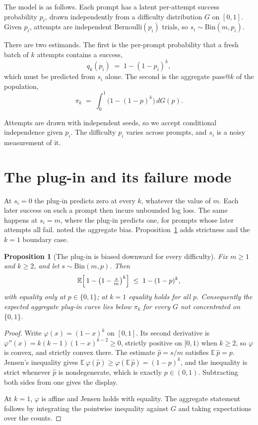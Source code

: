 \documentclass[11pt]{article}
\theoremstyle{itheads}
\newtheorem{proposition}{Proposition}
\begin{document}
The model is as follows. Each prompt has a latent per-attempt
success probability $p_i$, drawn independently from a difficulty
distribution $G$ on $[0,1]$. Given $p_i$, attempts are independent
$\mathrm{Bernoulli}(p_i)$ trials, so $s_i \sim \mathrm{Bin}(m,
p_i)$.

There are two estimands. The first is the per-prompt probability
that a fresh batch of $k$ attempts contains a success,
\begin{equation}
q_k(p_i) \;=\; 1-(1-p_i)^{k},
\end{equation}
which must be predicted from $s_i$ alone. The second is the
aggregate pass@$k$ of the population,
\begin{equation}
\pi_k \;=\; \int_0^1 \bigl(1-(1-p)^k\bigr)\,dG(p).
\end{equation}

Attempts are drawn with independent seeds, so we accept conditional
independence given $p_i$. The difficulty $p_i$ varies across
prompts, and $s_i$ is a noisy measurement of it.

\section{The plug-in and its failure mode}

At $s_i=0$ the plug-in predicts zero at every $k$, whatever the
value of $m$. Each later success on such a prompt then incurs
unbounded log loss. The same happens at $s_i = m$, where the plug-in
predicts one, for prompts whose later attempts all fail.
\citet{chen2021} noted the aggregate bias.
Proposition~\ref{prop:bias} adds strictness and the $k=1$ boundary
case.

\begin{proposition}[The plug-in is biased downward for every
difficulty]\label{prop:bias}
Fix $m \ge 1$ and $k \ge 2$, and let $s \sim \mathrm{Bin}(m,p)$.
Then
\begin{equation}
\mathbb{E}\Bigl[\,1-\bigl(1-\tfrac{s}{m}\bigr)^{k}\Bigr]
\;\le\; 1-(1-p)^k,
\end{equation}
with equality only at $p \in \{0,1\}$; at $k=1$ equality holds for
all $p$. Consequently the expected aggregate plug-in curve lies
below $\pi_k$ for every $G$ not concentrated on $\{0,1\}$.
\end{proposition}

\begin{proof}
Write $\varphi(x) = (1-x)^k$ on $[0,1]$. Its second derivative is
$\varphi''(x) = k(k-1)(1-x)^{k-2} \ge 0$, strictly positive on
$[0,1)$ when $k \ge 2$, so $\varphi$ is convex, and strictly convex
there. The estimate $\hat p = s/m$ satisfies
$\mathbb{E}\,\hat p = p$. Jensen's inequality gives
$\mathbb{E}\,\varphi(\hat p) \ge \varphi(\mathbb{E}\,\hat p)
= (1-p)^k$, and the inequality is strict whenever $\hat p$ is
nondegenerate, which is exactly $p \in (0,1)$. Subtracting both
sides from one gives the display.

At $k=1$, $\varphi$ is
affine and Jensen holds with equality. The aggregate statement
follows by integrating the pointwise inequality against $G$ and
taking expectations over the counts.
\end{proof}
\end{document}
